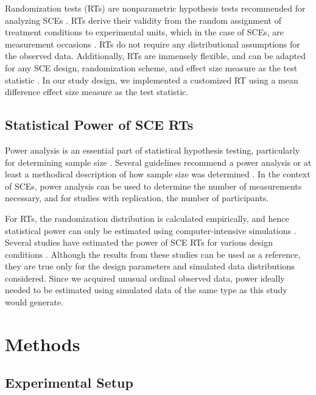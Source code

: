 \documentclass[empirical,issue, twocolumn,authordate]{jote-new-article}
\begin{document}
Randomization tests (RTs) are nonparametric hypothesis tests recommended for analyzing SCEs \parencite{Edgington1975, Adams1996, Heyvaert2014}. RTs derive their validity from the random assignment of treatment conditions to experimental units, which in the case of SCEs, are measurement occasions \parencite{Edgington2007}. RTs do not require any distributional assumptions for the observed data. Additionally, RTs are immensely flexible, and can be adapted for any SCE design, randomization scheme, and effect size measure as the test statistic \parencite{Michiels2020, Heyvaert2014a, Heyvaert2014}. In our study design, we implemented a customized RT using a mean difference effect size measure as the test statistic. 

\subsection{Statistical Power of SCE RTs }

Power analysis is an essential part of statistical hypothesis testing, particularly for determining sample size \parencite{Cohen1988}. Several guidelines recommend a power analysis or at least a methodical description of how sample size was determined \parencite{Vohra2015, Willkinson1999}. In the context of SCEs, power analysis can be used to determine the number of measurements necessary, and for studies with replication, the number of participants.

For RTs, the randomization distribution is calculated empirically, and hence statistical power can only be estimated using computer-intensive simulations \parencite{Onghena1992, Ferron1995}. Several studies have estimated the power of SCE RTs for various design conditions \parencite{Ferron1996, Ferron1995, Michiels2018, Bouwmeester2020, Ferron2002, De2020}. Although the results from these studies can be used as a reference, they are true only for the design parameters and simulated data distributions considered. Since we acquired unusual ordinal observed data, power ideally needed to be estimated using simulated data of the same type as this study would generate.

\section{Methods}

\subsection{Experimental Setup}
\end{document}
